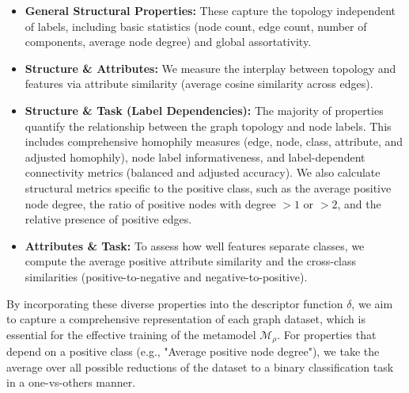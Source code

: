 \begin{itemize}
    \item \textbf{General Structural Properties:} These capture the topology independent of labels, including basic statistics (node count, edge count, number of components, average node degree) and global assortativity.
    \item \textbf{Structure \& Attributes:} We measure the interplay between topology and features via attribute similarity (average cosine similarity across edges).
    \item \textbf{Structure \& Task (Label Dependencies):} The majority of properties quantify the relationship between the graph topology and node labels. This includes comprehensive homophily measures (edge, node, class, attribute, and adjusted homophily), node label informativeness, and label-dependent connectivity metrics (balanced and adjusted accuracy). We also calculate structural metrics specific to the positive class, such as the average positive node degree, the ratio of positive nodes with degree $>1$ or $>2$, and the relative presence of positive edges.
    \item \textbf{Attributes \& Task:} To assess how well features separate classes, we compute the average positive attribute similarity and the cross-class similarities (positive-to-negative and negative-to-positive).
\end{itemize}

By incorporating these diverse properties into the descriptor function \( \delta \), we aim to capture a comprehensive representation of each graph dataset, which is essential for the effective training of the metamodel \( \mathcal{M}_\rho \). For properties that depend on a positive class (e.g., "Average positive node degree"), we take the average over all possible reductions of the dataset to a binary classification task in a one-vs-others manner.
